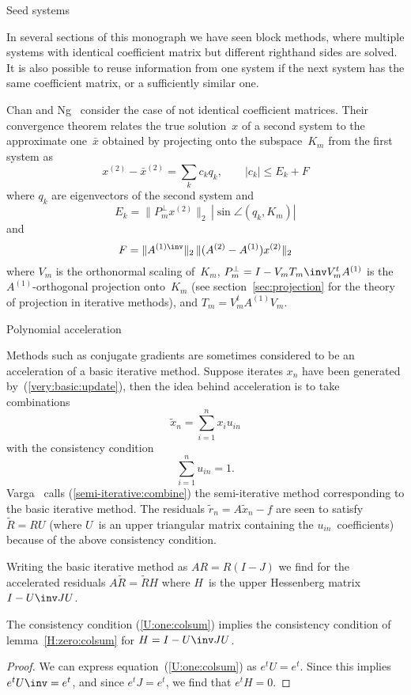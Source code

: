 \documentclass[11pt]{artikel3}
\begin{document}
\begin{Outline}
 {Seed systems}
\label{sec:seed}
\FurtherReading

In several sections of this monograph we have seen block methods,
where multiple systems with identical coefficient matrix but different
righthand sides are solved. It is also possible to reuse information
from one system if the next system has the same coefficient matrix, or
a sufficiently similar one.

Chan and Ng~\cite{ChanNg:Galerkin-multiple} consider the case of not
identical coefficient matrices. Their convergence theorem relates the
true solution~$x$ of a second system to the approximate one~$\bar x$
obtained by projecting onto the subspace~$K_m$ from the first system
as
\[ x^{(2)}-\bar x^{(2)}=\sum_k c_k q_k, \qquad |c_k|\leq E_k+F \]
where $q_k$ are eigenvectors of the second system and
\[ E_k = \|P^\perp_m x^{(2)}\|_2\,|\sin\angle(q_k,K_m)| \]
and
\[ F=\|A^{(1)\inv}\|_2\, \|(A^{(2)}-A^{(1)})x^{(2)}\|_2\]
where $V_m$ is the orthonormal scaling of~$K_m$,
$P^\perp_m=I-V_mT_m\inv V^t_mA^{(1)}$ is the $A^{(1)}$-orthogonal
projection onto~$K_m$ (see section~\ref{sec:projection} for the
theory of projection in iterative methods), and $T_m=V^t_mA^{(1)}V_m$.

 {Polynomial acceleration}\label{sec:poly:acc}
\FurtherReading

Methods such as conjugate gradients are sometimes considered to be
an acceleration of a basic iterative method. Suppose iterates $x_n$
have been generated by~(\ref{very:basic:update}), then
the idea behind acceleration is to take combinations 
\begin{equation}
        \tilde x_n=\sum_{i=1}^n x_iu_{in}
        \label{semi-iterative:combine}\end{equation}
with the consistency condition 
\begin{equation}
        \sum_{i=1}^nu_{in}=1.
        \label{U:one:colsum}\end{equation}
Varga~\cite{Va:book} calls (\ref{semi-iterative:combine}) the
semi-iterative method corresponding to the basic iterative method. The
residuals $\tilde r_n=A\tilde x_n-f$ are seen to satisfy~$\tilde R=RU$
(where $U$~is an upper triangular matrix containing the
$u_{in}$~coefficients) 
because of the above consistency condition.

Writing the basic iterative method as $AR=R(I-J)$ we find for the
accelerated residuals $A\tilde R=\tilde RH$ where $H$~is the upper
Hessenberg matrix~$I-U\inv JU$.

\begin{lemma}
The consistency condition (\ref{U:one:colsum}) implies the consistency
condition of lemma~\ref{H:zero:colsum}  for $H=I-U\inv JU$.
\end{lemma}
\begin{proof} We can express equation~(\ref{U:one:colsum}) as $e^tU=e^t$.
Since this implies $e^tU\inv =e^t$, and since $e^tJ=e^t$, we find that
$e^tH=0$.\end{proof}


\end{Outline}
\end{document}
